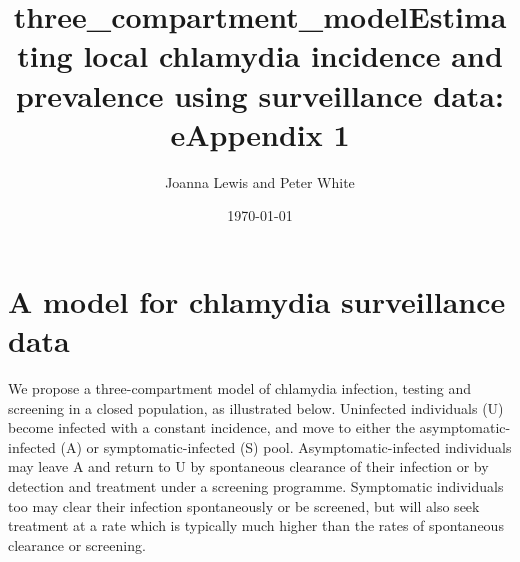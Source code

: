 \documentclass{article}
\title{three\_compartment\_model}
\begin{document}
    
    
    \author{Joanna Lewis and Peter White}\title{Estimating local chlamydia incidence and prevalence using surveillance data: eAppendix 1}

\date{\today}
\maketitle

\tableofcontents


    
    

    
    \section{A model for chlamydia surveillance
data}\label{a-model-for-chlamydia-surveillance-data}

We propose a three-compartment model of chlamydia infection, testing and
screening in a closed population, as illustrated below. Uninfected
individuals (U) become infected with a constant incidence, and move to
either the asymptomatic-infected (A) or symptomatic-infected (S) pool.
Asymptomatic-infected individuals may leave A and return to U by
spontaneous clearance of their infection or by detection and treatment
under a screening programme. Symptomatic individuals too may clear their
infection spontaneously or be screened, but will also seek treatment at
a rate which is typically much higher than the rates of spontaneous
clearance or screening.
\end{document}
